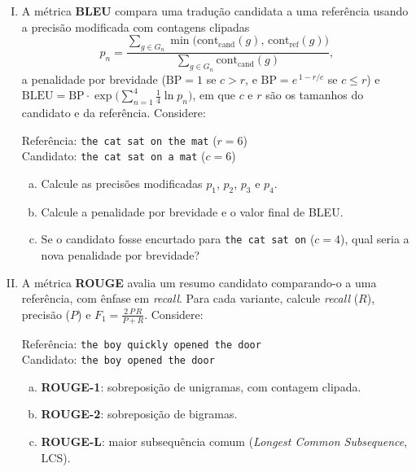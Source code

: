 \documentclass{dlproblemset}
\begin{document}
\begin{enumerate}[I)]
\item A métrica \textbf{BLEU} compara uma tradução candidata a uma referência usando a
precisão modificada com contagens clipadas
\[
    p_n = \frac{\sum_{g \in G_n} \min\bigl(\text{cont}_{\text{cand}}(g),\, \text{cont}_{\text{ref}}(g)\bigr)}{\sum_{g \in G_n} \text{cont}_{\text{cand}}(g)},
\]
a penalidade por brevidade ($\text{BP} = 1$ se $c > r$, e $\text{BP} = e^{\,1 - r/c}$ se
$c \le r$) e $\text{BLEU} = \text{BP} \cdot \exp\bigl(\sum_{n=1}^{4} \tfrac{1}{4} \ln p_n\bigr)$,
em que $c$ e $r$ são os tamanhos do candidato e da referência. Considere:
\begin{center}
    Referência: \texttt{the cat sat on the mat} \quad ($r = 6$) \\
    Candidato: \texttt{the cat sat on a mat} \quad ($c = 6$)
\end{center}
\begin{enumerate}[(a)]
    \item Calcule as precisões modificadas $p_1$, $p_2$, $p_3$ e $p_4$.
    \item Calcule a penalidade por brevidade e o valor final de BLEU.
    \item Se o candidato fosse encurtado para \texttt{the cat sat on} ($c = 4$), qual seria a
    nova penalidade por brevidade?
\end{enumerate}

\item A métrica \textbf{ROUGE} avalia um resumo candidato comparando-o a uma referência, com
ênfase em \textit{recall}. Para cada variante, calcule \textit{recall} ($R$), precisão ($P$) e
$F_1 = \frac{2\,P\,R}{P + R}$. Considere:
\begin{center}
    Referência: \texttt{the boy quickly opened the door} \\
    Candidato: \texttt{the boy opened the door}
\end{center}
\begin{enumerate}[(a)]
    \item \textbf{ROUGE-1}: sobreposição de unigramas, com contagem clipada.
    \item \textbf{ROUGE-2}: sobreposição de bigramas.
    \item \textbf{ROUGE-L}: maior subsequência comum (\textit{Longest Common Subsequence}, LCS).
\end{enumerate}


\end{enumerate}
\end{document}
